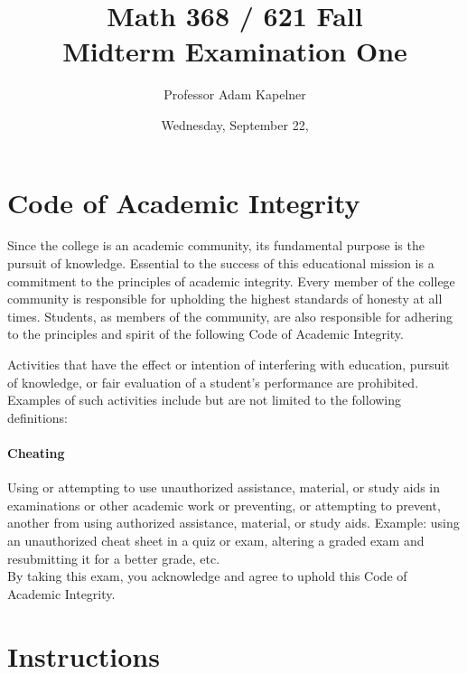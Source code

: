 \documentclass[12pt,landscape]{article}
\title{Math 368 / 621 Fall \the\year{} \\ Midterm Examination One}
\author{Professor Adam Kapelner}
\date{Wednesday, September 22, \the\year{}}
\begin{document}
\maketitle


\thispagestyle{empty}

\section*{Code of Academic Integrity}

\footnotesize
Since the college is an academic community, its fundamental purpose is the pursuit of knowledge. Essential to the success of this educational mission is a commitment to the principles of academic integrity. Every member of the college community is responsible for upholding the highest standards of honesty at all times. Students, as members of the community, are also responsible for adhering to the principles and spirit of the following Code of Academic Integrity.

Activities that have the effect or intention of interfering with education, pursuit of knowledge, or fair evaluation of a student's performance are prohibited. Examples of such activities include but are not limited to the following definitions:

\paragraph{Cheating} Using or attempting to use unauthorized assistance, material, or study aids in examinations or other academic work or preventing, or attempting to prevent, another from using authorized assistance, material, or study aids. Example: using an unauthorized cheat sheet in a quiz or exam, altering a graded exam and resubmitting it for a better grade, etc.
\\

\noindent By taking this exam, you acknowledge and agree to uphold this Code of Academic Integrity. \\


\normalsize

\section*{Instructions}
\end{document}

